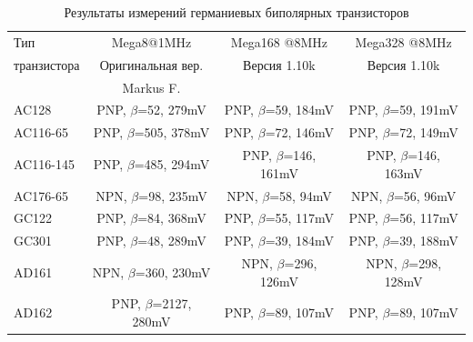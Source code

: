 \begin{table}[H]
  \begin{center}
    \begin{tabular}{| l | c | c | c |}
    \hline
      Тип & Mega8@1MHz          & Mega168 @8MHz       & Mega328 @8MHz    \\
 транзистора    & Оригинальная вер.    & Версия 1.10k       & Версия 1.10k  \\
            & Markus F.           &                     &        \\
    \hline
    \hline
AC128       & PNP, \(\beta\)=52, 279mV    & PNP, \(\beta\)=59, 184mV    & PNP, \(\beta\)=59, 191mV    \\
    \hline
AC116-65    & PNP, \(\beta\)=505, 378mV   & PNP, \(\beta\)=72, 146mV    & PNP, \(\beta\)=72, 149mV    \\
    \hline
AC116-145   & PNP, \(\beta\)=485, 294mV   & PNP, \(\beta\)=146, 161mV    & PNP, \(\beta\)=146, 163mV   \\
    \hline
AC176-65    & NPN, \(\beta\)=98, 235mV    & NPN, \(\beta\)=58, 94mV    & NPN, \(\beta\)=56, 96mV     \\
    \hline
GC122       & PNP, \(\beta\)=84, 368mV    & PNP, \(\beta\)=55, 117mV    & PNP, \(\beta\)=56, 117mV    \\
    \hline
GC301       & PNP, \(\beta\)=48, 289mV    & PNP, \(\beta\)=39, 184mV    & PNP, \(\beta\)=39, 188mV    \\
    \hline
AD161       & NPN, \(\beta\)=360, 230mV   & NPN, \(\beta\)=296, 126mV   & NPN, \(\beta\)=298, 128mV    \\
    \hline
AD162       & PNP, \(\beta\)=2127, 280mV  & PNP, \(\beta\)=89, 107mV    & PNP, \(\beta\)=89, 107mV    \\
    \hline
    \end{tabular}
  \end{center}
  \caption{Результаты измерений германиевых биполярных транзисторов}
  \label{tab:germanium}
\end{table}

